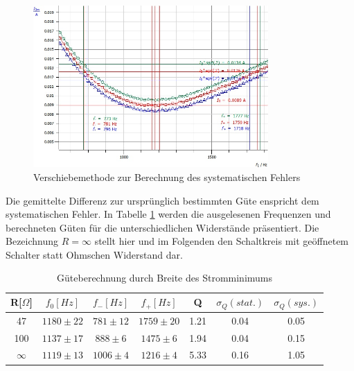 \documentclass[12pt,a4paper]{article}
\begin{document}
\begin{figure}[H]
	\centering
	\includegraphics[width=0.8\textwidth]{Daten/P47Ohm_f0_sys.jpg}
	\caption{Verschiebemethode zur Berechnung des systematischen Fehlers}
	\label{P47Ohm_f0_sys}
\end{figure}
Die gemittelte Differenz zur ursprünglich bestimmten Güte enspricht dem systematischen Fehler. In Tabelle \ref{table:P_f0} werden die ausgelesenen Frequenzen und berechneten Güten für die unterschiedlichen Widerstände präsentiert. Die Bezeichnung $R=\infty$ stellt hier und im Folgenden den Schaltkreis mit geöffnetem Schalter statt Ohmschen Widerstand dar.
\begin{table}[H]
	\centering
	\begin{tabular}{|c|c|c|c|c|c|c|}
		\hline
		R[$\Omega$]&$f_0[Hz]$&$f_-[Hz]$&$f_+[Hz]$&Q&$\sigma_Q(stat.)$&$\sigma_Q(sys.)$\\
		\hline
		47&$1180\pm22$&$781\pm12$&$1759\pm20$&1.21&0.04&0.05\\
		100&$1137\pm17$&$888\pm6$&$1475\pm6$&1.94&0.04&0.15\\
		$\infty$&$1119\pm13$&$1006\pm4$&$1216\pm4$&5.33&0.16&1.05\\
		\hline		
	\end{tabular}
	\caption{Güteberechnung durch Breite des Stromminimums}
	\label{table:P_f0}
\end{table}
\end{document}
